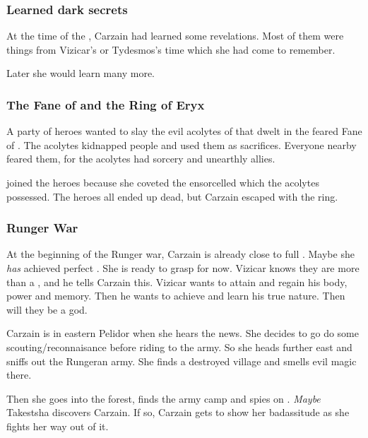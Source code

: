 \subsubsection{Learned dark secrets}
At the time of the , Carzain had learned some  revelations.
Most of them were things from Vizicar's or Tydesmos's time which she had come to remember. 

Later she would learn many more. 





\subsubsection{The Fane of \KulYana and the Ring of Eryx}
A party of heroes wanted to slay the evil acolytes of  that dwelt in the feared Fane of \KulYana. 
The acolytes kidnapped people and used them as sacrifices. 
Everyone nearby feared them, for the acolytes had sorcery and unearthly allies. 

\CarzainShachar joined the heroes because she coveted the ensorcelled  which the acolytes possessed.
The heroes all ended up dead, but Carzain escaped with the ring.






\subsubsection{Runger War}
At the beginning of the Runger war, Carzain is already close to full \kenosis. 
Maybe she \emph{has} achieved perfect \kenosis. 
She is ready to grasp for \apotheosis{} now.
Vizicar knows they are more than a \human, and he tells Carzain this. 
Vizicar wants to attain \kenosis{} and regain his body, power and memory. 
Then he wants to achieve \apotheosis{} and learn his true nature.
Then will they be a god. 

Carzain is in eastern Pelidor when she hears the news. 
She decides to go do some scouting/reconnaisance before riding to the army. 
So she heads further east and sniffs out the Rungeran army. 
She finds a destroyed village and smells evil magic there. 

Then she goes into the forest, finds the army camp and spies on . 
\emph{Maybe} Takestsha discovers Carzain. 
If so, Carzain gets to show her badassitude as she fights her way out of it. 

